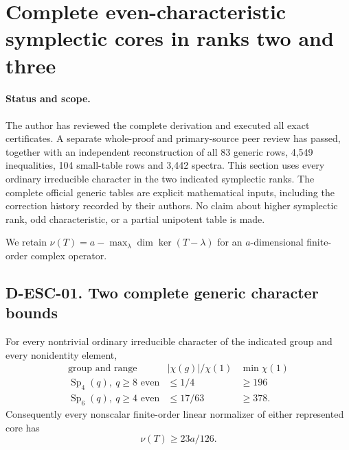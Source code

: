 \section{Complete even-characteristic symplectic cores in ranks two and three}
\label{sec:even-symplectic-low-rank}

\paragraph{Status and scope.}
The author has reviewed the complete derivation and executed all exact
certificates.  A separate whole-proof and primary-source peer review
has passed, together with an independent reconstruction of all
83 generic rows, 4,549 inequalities, 104 small-table rows and
3,442 spectra.  This section uses every ordinary irreducible character
in the two indicated symplectic ranks.  The complete official generic
tables are explicit mathematical inputs, including the correction
history recorded by their authors.  No claim about higher symplectic
rank, odd characteristic, or a partial unipotent table is made.

We retain $\nu(T)=a-\max_\lambda\dim\ker(T-\lambda)$ for an
$a$-dimensional finite-order complex operator.

\subsection*{D-ESC-01. Two complete generic character bounds}

\begin{lemma}
\label{D-ESC-01}
For every nontrivial ordinary irreducible character of the indicated
group and every nonidentity element,
\[
\begin{array}{c|c|c}
\text{group and range}&|\chi(g)|/\chi(1)&\min\chi(1)\\\hline
\operatorname{Sp}_4(q),\ q\ge8\text{ even}&\le1/4&\ge196\\
\operatorname{Sp}_6(q),\ q\ge4\text{ even}&\le17/63&\ge378.
\end{array}                                                   \tag{ESC.1}
\]
Consequently every nonscalar finite-order linear normalizer of
either represented core has
\[
                           \nu(T)\ge23a/126.              \tag{ESC.2}
\]
\end{lemma}

